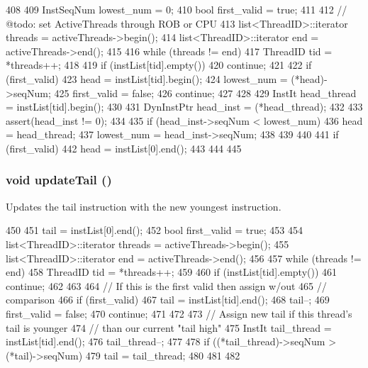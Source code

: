 \begin{DoxyCode}
408 {
409     InstSeqNum lowest_num = 0;
410     bool first_valid = true;
411 
412     // @todo: set ActiveThreads through ROB or CPU
413     list<ThreadID>::iterator threads = activeThreads->begin();
414     list<ThreadID>::iterator end = activeThreads->end();
415 
416     while (threads != end) {
417         ThreadID tid = *threads++;
418 
419         if (instList[tid].empty())
420             continue;
421 
422         if (first_valid) {
423             head = instList[tid].begin();
424             lowest_num = (*head)->seqNum;
425             first_valid = false;
426             continue;
427         }
428 
429         InstIt head_thread = instList[tid].begin();
430 
431         DynInstPtr head_inst = (*head_thread);
432 
433         assert(head_inst != 0);
434 
435         if (head_inst->seqNum < lowest_num) {
436             head = head_thread;
437             lowest_num = head_inst->seqNum;
438         }
439     }
440 
441     if (first_valid) {
442         head = instList[0].end();
443     }
444 
445 }
\end{DoxyCode}
\hypertarget{classROB_acc69b1041902d0557b7be476f5c547aa}{
\subsubsection[{updateTail}]{\setlength{\rightskip}{0pt plus 5cm}void updateTail ()}}
\label{classROB_acc69b1041902d0557b7be476f5c547aa}
Updates the tail instruction with the new youngest instruction. 


\begin{DoxyCode}
450 {
451     tail = instList[0].end();
452     bool first_valid = true;
453 
454     list<ThreadID>::iterator threads = activeThreads->begin();
455     list<ThreadID>::iterator end = activeThreads->end();
456 
457     while (threads != end) {
458         ThreadID tid = *threads++;
459 
460         if (instList[tid].empty()) {
461             continue;
462         }
463 
464         // If this is the first valid then assign w/out
465         // comparison
466         if (first_valid) {
467             tail = instList[tid].end();
468             tail--;
469             first_valid = false;
470             continue;
471         }
472 
473         // Assign new tail if this thread's tail is younger
474         // than our current "tail high"
475         InstIt tail_thread = instList[tid].end();
476         tail_thread--;
477 
478         if ((*tail_thread)->seqNum > (*tail)->seqNum) {
479             tail = tail_thread;
480         }
481     }
482 }
\end{DoxyCode}


